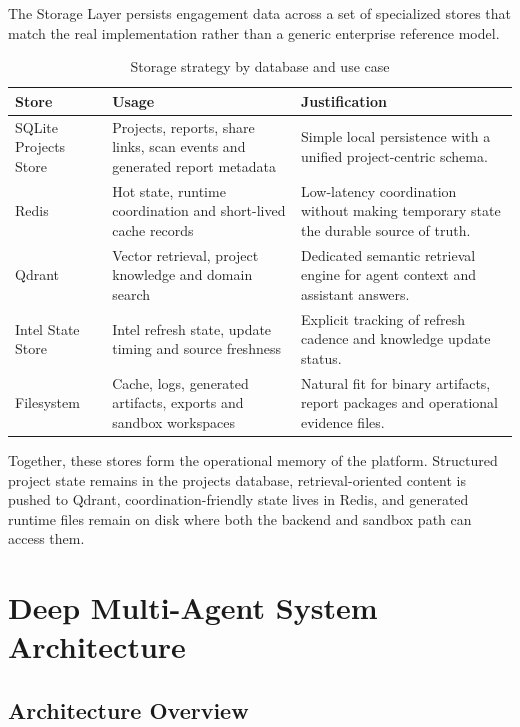 \documentclass[12pt,a4paper]{report}
\begin{document}
The Storage Layer persists engagement data across a set of specialized stores that
match the real implementation rather than a generic enterprise reference model.

\begin{table}[H]
    \centering
    \caption{Storage strategy by database and use case}
    \label{tab:storage}
    \renewcommand{\arraystretch}{1.35}
    \begin{tabular}{|p{}|p{}|p{}|}
        \hline
        \textbf{Store} & \textbf{Usage} & \textbf{Justification} \\
        \hline
        SQLite Projects Store & Projects, reports, share links, scan events and generated report metadata & Simple local persistence with a unified project-centric schema. \\
        \hline
        Redis & Hot state, runtime coordination and short-lived cache records & Low-latency coordination without making temporary state the durable source of truth. \\
        \hline
        Qdrant & Vector retrieval, project knowledge and domain search & Dedicated semantic retrieval engine for agent context and assistant answers. \\
        \hline
        Intel State Store & Intel refresh state, update timing and source freshness & Explicit tracking of refresh cadence and knowledge update status. \\
        \hline
        Filesystem & Cache, logs, generated artifacts, exports and sandbox workspaces & Natural fit for binary artifacts, report packages and operational evidence files. \\
        \hline
    \end{tabular}
\end{table}

Together, these stores form the operational memory of the platform. Structured
project state remains in the projects database, retrieval-oriented content is pushed
to Qdrant, coordination-friendly state lives in Redis, and generated runtime files
remain on disk where both the backend and sandbox path can access them.

\section{Deep Multi-Agent System Architecture}

\subsection{Architecture Overview}
\end{document}
